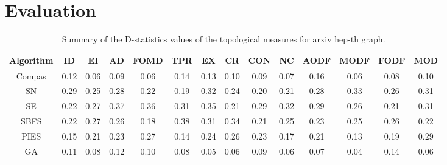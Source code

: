 \section{Evaluation}

\begin{table}
\centering
\caption{Summary of the D-statistics values of the topological measures for arxiv hep-th graph.}
\label{tab_hep-th}
\begin{adjustbox}{max width=\textwidth}
\begin{tabular}{c|c c c c c c c c c c c c c}
\hline
Algorithm & ID & EI & AD & FOMD & TPR & EX & CR & CON & NC & AODF & MODF & FODF & MOD \\ \hline
Compas    & 0.12 & 0.06 &0.09 & 0.06  &  0.14 & 0.13  &  0.10   & 0.09   & 0.07     &   0.16   &  0.06& 0.08   &  0.10   \\ 
SN        & 0.29   & 0.25   & 0.28   &  0.22    &  0.19   & 0.32   &  0.24  &  0.20   & 0.21   & 0.28     & 0.33     &   0.26   &  0.31 \\ 
SE        & 0.22   &  0.27  &  0.37  &  0.36    &  0.31   &  0.35  &  0.21  &  0.29   &  0.32  &  0.29    &  0.26    & 0.21     &  0.31   \\ 
SBFS      &  0.22  & 0.27   &  0.26  &  0.18    &   0.38  &  0.31  & 0.34    &  0.21   & 0.25   &  0.23    & 0.25     &  0.26    &  0.22   \\ 
PIES      & 0.15   &  0.21  &  0.23  &  0.27    &  0.14   & 0.24    & 0.26   & 0.23    &  0.17  & 0.21     &  0.13   &  0.19    &  0.29   \\ 
GA        &  0.11  & 0.08   & 0.12   &   0.10   & 0.08    & 0.05   & 0.06   & 0.09    &   0.06 &  0.07    &  0.04    &  0.14 &  0.06 \\ \hline
\end{tabular}
\end{adjustbox}
\vspace{3mm}
\end{table}


